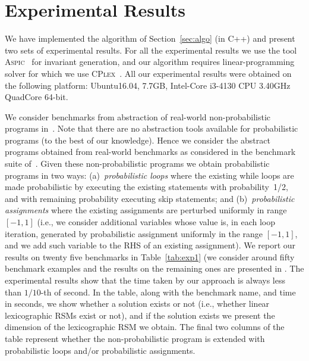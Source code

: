 
\section{Experimental Results}\label{sec:experiments}
We have implemented the algorithm of Section~\ref{sec:algo} (in C++) and present two sets of experimental results.
For all the experimental results we use the tool \textsc{Aspic}~\cite{FG10:aspic} for 
invariant generation, 
and our algorithm requires linear-programming solver for which we use 
\textsc{CPlex}~\cite{cplex}.
All our experimental results were obtained on the following platform: 
Ubuntu16.04, 7.7GB, Intel-Core i3-4130 CPU 3.40GHz QuadCore 64-bit.


\smallskip{}
We consider benchmarks from abstraction of real-world non-probabilistic programs 
in~\cite{ADFG10:lexicographic}.
Note that there are no abstraction tools available for probabilistic programs 
(to the best of our knowledge). 
Hence we consider the abstract programs obtained from real-world benchmarks as 
considered in the benchmark suite of~\cite{ADFG10:lexicographic}.
Given these non-probabilistic programs we obtain probabilistic programs in two ways:
(a)~{\em probabilistic loops} where the existing while loops are made probabilistic 
by executing the existing statements with probability~1/2, and with remaining 
probability executing skip statements; and
(b)~{\em probabilistic assignments} where the existing assignments are perturbed uniformly in range $[-1,1]$ 
(i.e., we consider additional variables whose value is, in each loop iteration, generated by 
probabilistic assignment uniformly in the range $[-1,1]$, and we add such variable 
to the RHS of an existing assignment).
We report our results on twenty five benchmarks in Table~\ref{tab:exp1} (we 
consider around fifty benchmark examples and the results on the remaining ones 
are presented in \AppendixMaterial.
The experimental results show that the time taken by our approach is always less 
than $1/10$-th of second.
In the table, along with the benchmark name, and time in seconds, we show 
whether a solution exists or not (i.e., whether linear lexicographic RSMs exist
or not), and if the solution exists we present the dimension of the lexicographic RSM
we obtain. 
The final two columns of the table represent whether the non-probabilistic 
program is extended with probabilistic loops and/or probabilistic assignments.


